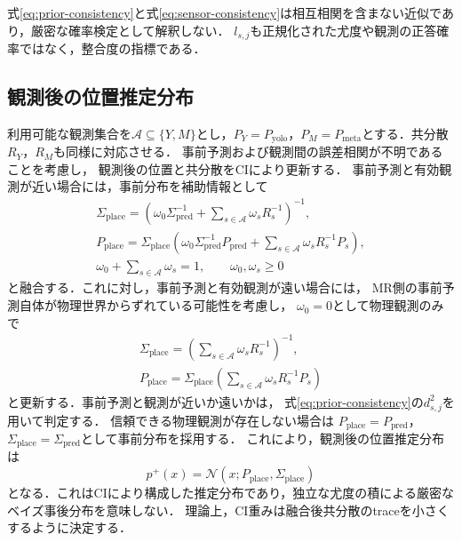 \documentclass{sice-si}
\newenvironment{dotsubequations}{%
  \begin{subequations}
  \renewcommand{\theequation}{\theparentequation.\arabic{equation}}%
}{\end{subequations}}
\begin{document}
式\eqref{eq:prior-consistency}と式\eqref{eq:sensor-consistency}は相互相関を含まない近似であり，厳密な確率検定として解釈しない．
$l_{s,j}$も正規化された尤度や観測の正答確率ではなく，整合度の指標である．

\subsection{観測後の位置推定分布}
利用可能な観測集合を$\mathcal{A}\subseteq\{Y,M\}$とし，$P_Y=P_{\mathrm{yolo}}$，$P_M=P_{\mathrm{meta}}$とする．共分散$R_Y$，$R_M$も同様に対応させる．
事前予測および観測間の誤差相関が不明であることを考慮し，
観測後の位置と共分散をCIにより更新する．
事前予測と有効観測が近い場合には，事前分布を補助情報として
\begin{dotsubequations}
\begin{align}
\Sigma_{\mathrm{place}}=
\left(\omega_0\Sigma_{\mathrm{pred}}^{-1}
+\sum_{s\in\mathcal{A}}\omega_s R_s^{-1}\right)^{-1},
\label{eq:place-cov}\\
P_{\mathrm{place}}=\Sigma_{\mathrm{place}}
\left(\omega_0\Sigma_{\mathrm{pred}}^{-1}P_{\mathrm{pred}}
+\sum_{s\in\mathcal{A}}\omega_s R_s^{-1}P_s\right),
\label{eq:place-mean}\\
\omega_0+\sum_{s\in\mathcal{A}}\omega_s=1,
\qquad \omega_0,\omega_s\geq0
\label{eq:weights}
\end{align}
\end{dotsubequations}
と融合する．これに対し，事前予測と有効観測が遠い場合には，
MR側の事前予測自体が物理世界からずれている可能性を考慮し，
$\omega_0=0$として物理観測のみで
\begin{dotsubequations}
\begin{align}
\Sigma_{\mathrm{place}}=
\left(\sum_{s\in\mathcal{A}}\omega_s R_s^{-1}\right)^{-1},
\label{eq:place-cov-obs}\\
P_{\mathrm{place}}=\Sigma_{\mathrm{place}}
\left(\sum_{s\in\mathcal{A}}\omega_s R_s^{-1}P_s\right)
\label{eq:place-mean-obs}
\end{align}
\end{dotsubequations}
と更新する．事前予測と観測が近いか遠いかは，
式\eqref{eq:prior-consistency}の$d^2_{s,j}$を用いて判定する．
信頼できる物理観測が存在しない場合は
$P_{\mathrm{place}}=P_{\mathrm{pred}}$，
$\Sigma_{\mathrm{place}}=\Sigma_{\mathrm{pred}}$として事前分布を採用する．
これにより，観測後の位置推定分布は
\begin{equation}
p^{+}(x)=\mathcal{N}(x;P_{\mathrm{place}},\Sigma_{\mathrm{place}})
\label{eq:posterior}
\end{equation}
となる．これはCIにより構成した推定分布であり，独立な尤度の積による厳密なベイズ事後分布を意味しない．
理論上，CI重みは融合後共分散のtraceを小さくするように決定する．
\end{document}
